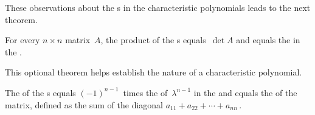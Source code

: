 These observations about the s in the characteristic polynomials leads to the next theorem.

\begin{theorem} \label{thm:charpolyc}
For every \(n\times n\) matrix~\(A\), the product of the s equals~\(\det A\) and equals the  in the .  
\begin{aside}
This optional theorem helps establish the nature of a characteristic polynomial.
\end{aside}
The  of the s equals \((-1)^{n-1}\)~times the  of~\(\lambda^{n-1}\) in the  and equals the  of the matrix, defined as the sum of the diagonal  \(a_{11}+a_{22}+\cdots+a_{nn}\)\,.
\end{theorem}

